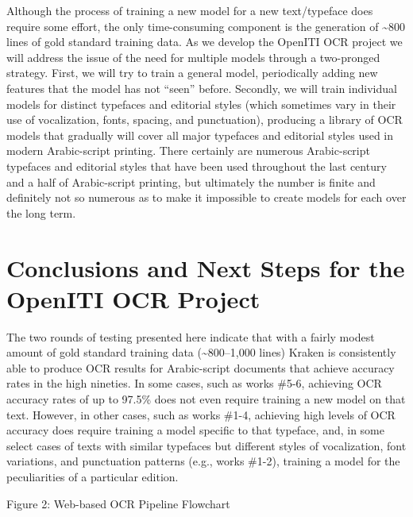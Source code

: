 Although the process of training a new model for a new text/typeface does
require some effort, the only time-consuming component is the generation of
\textasciitilde800 lines of gold standard training data. As we develop the OpenITI OCR
project we will address the issue of the need for multiple models through a
two-pronged strategy. First, we will try to train a general model, periodically
adding new features that the model has not “seen” before. Secondly, we will
train individual models for distinct typefaces and editorial styles (which
sometimes vary in their use of vocalization, fonts, spacing, and punctuation),
producing a library of OCR models that gradually will cover all major typefaces
and editorial styles used in modern Arabic-script printing. There certainly are
numerous Arabic-script typefaces and editorial styles that have been used
throughout the last century and a half of Arabic-script printing, but
ultimately the number is finite and definitely not so numerous as to make it
impossible to create models for each over the long term.  


\section{Conclusions and Next Steps for the OpenITI OCR Project}

The two rounds of testing presented here indicate that with a fairly modest
amount of gold standard training data (\textasciitilde800–1,000 lines) Kraken is
consistently able to produce OCR results for Arabic-script documents that
achieve accuracy rates in the high nineties. In some cases, such as works
\#5-6, achieving OCR accuracy rates of up to 97.5\% does not even require
training a new model on that text. However, in other cases, such as works
\#1-4, achieving high levels of OCR accuracy does require training a model
specific to that typeface, and, in some select cases of texts with similar
typefaces but different styles of vocalization, font variations, and
punctuation patterns (e.g., works \#1-2), training a model for the
peculiarities of a particular edition.


Figure 2: Web-based OCR Pipeline Flowchart
  

